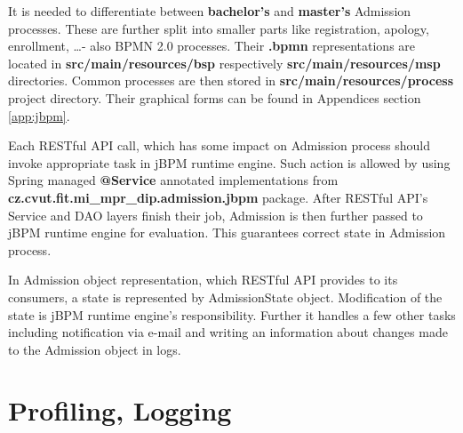 	It is needed to differentiate between \textbf{bachelor's} and \textbf{master's} Admission processes. These are further
	split into smaller parts like registration, apology, enrollment, \ldots - also BPMN 2.0 processes. Their \textbf{.bpmn}
	representations are located in \textbf{src/main/resources/bsp} respectively \textbf{src/main/resources/msp}
	directories. Common processes are then stored in \textbf{src/main/resources/process} project directory. Their graphical
	forms can be found in Appendices section \ref{app:jbpm}.
	
	Each RESTful API call, which has some impact on Admission process should invoke appropriate task in jBPM runtime
	engine. Such action is allowed by using Spring managed \textbf{@Service} annotated implementations from
	\textbf{cz.cvut.fit.mi\_mpr\_dip.admission.jbpm} package. After RESTful API's Service and DAO layers finish their job,
	Admission is then further passed to jBPM runtime engine for evaluation. This guarantees correct state in Admission
	process.
	
	In Admission object representation, which RESTful API provides to its consumers, a state is represented by
	AdmissionState object. Modification of the state is jBPM runtime engine's responsibility. Further it handles a few
	other tasks including notification via e-mail and writing an information about changes made to the Admission object in
	logs.
	
	\section{Profiling, Logging}
